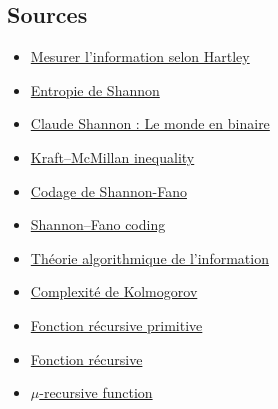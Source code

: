 \documentclass[10pt,a4paper]{article}
\theoremstyle{definition}
\numberwithin{lemma}{subsection}
\numberwithin{theorem}{subsection}
\numberwithin{definition}{subsection}
\numberwithin{proposition}{subsection}
\numberwithin{corollary}{subsection}
\numberwithin{property}{subsection}
\numberwithin{example}{subsection}
\numberwithin{heuristique}{subsection}
\numberwithin{scenario}{subsection}
\begin{document}
\subsection*{Sources}
\begin{itemize}
\item \href{https://www.sciencepresse.qc.ca/blogue/2014/12/24/mesurer-linformation-selon-hartley}{Mesurer l'information selon Hartley}
\item \href{https://fr.wikipedia.org/wiki/Entropie_de_Shannon}{Entropie de Shannon}
\item \href{https://centenaire-shannon.cnrs.fr/chapter/la-theorie-de-information}{Claude Shannon : Le monde en binaire}
\item \href{https://en.wikipedia.org/wiki/Kraft\%E2\%80\%93McMillan_inequality}{Kraft–McMillan inequality}
\item \href{https://fr.wikipedia.org/wiki/Codage_de_Shannon-Fano}{Codage de Shannon-Fano}
\item \href{https://en.wikipedia.org/wiki/Shannon\%E2\%80\%93Fano_coding}{Shannon–Fano coding}
\item \href{https://fr.wikipedia.org/wiki/Th%C3%A9orie_algorithmique_de_l%27information}{Théorie algorithmique de l'information}
\item \href{https://fr.wikipedia.org/wiki/Complexit%C3%A9_de_Kolmogorov}{Complexité de Kolmogorov}
\item \href{https://fr.wikipedia.org/wiki/Fonction_r%C3%A9cursive_primitive}{Fonction récursive primitive}
\item \href{https://fr.wikipedia.org/wiki/Fonction_r%C3%A9cursive}{Fonction récursive}
\item \href{https://en.wikipedia.org/wiki/%CE%9C-recursive\_function}{$\mu$-recursive function}
\end{itemize}
\end{document}
